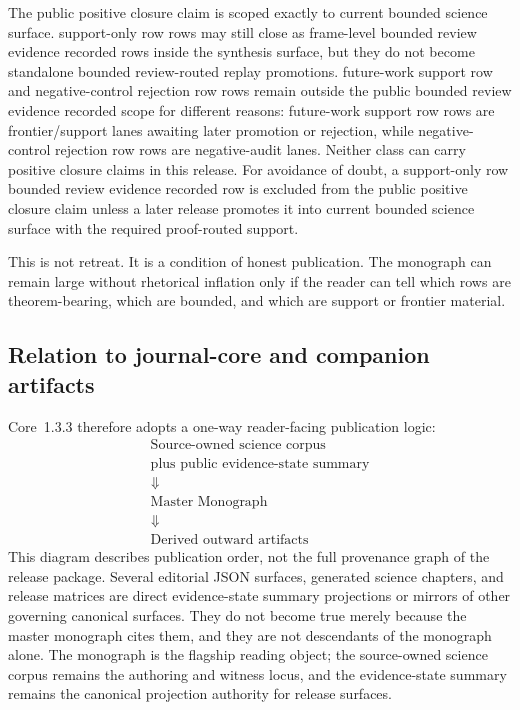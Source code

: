 The public positive closure claim is scoped exactly to
current bounded science surface. support-only row rows may still close as
frame-level bounded review evidence recorded rows inside the synthesis surface, but they do not become
standalone bounded review-routed replay promotions. future-work support row and
negative-control rejection row rows remain outside the public bounded review evidence recorded scope for different
reasons: future-work support row rows are frontier/support lanes awaiting later
promotion or rejection, while negative-control rejection row rows are negative-audit lanes.
Neither class can carry positive closure claims in this release.
For avoidance of doubt, a support-only row bounded review evidence recorded row is excluded
from the public positive closure claim unless a later release promotes it into
current bounded science surface with the required proof-routed support.

This is not retreat. It is a condition of honest publication. The monograph
can remain large without rhetorical inflation only if the reader can tell which
rows are theorem-bearing, which are bounded, and which are support or frontier
material.

\subsection{Relation to journal-core and companion artifacts}

Core~1.3.3 therefore adopts a one-way reader-facing publication logic:
\[
\begin{gathered}
\text{Source-owned science corpus}\\
\text{plus public evidence-state summary}\\
\Downarrow\\
\text{Master Monograph}\\
\Downarrow\\
\text{Derived outward artifacts}
\end{gathered}
\]
This diagram describes publication order, not the full provenance graph of
the release package. Several editorial JSON surfaces, generated science
chapters, and release matrices are direct evidence-state summary projections or mirrors of other
governing canonical surfaces. They do not become true merely because the
master monograph cites them, and they are not descendants of the monograph
alone. The monograph is the flagship reading object; the source-owned science
corpus remains the authoring and witness locus, and the evidence-state summary remains the canonical
projection authority for release surfaces.

